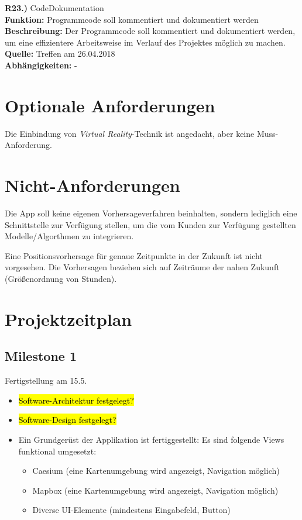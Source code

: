 \documentclass[12pt]{article} %
\begin{document}
\textbf{R23.)} CodeDokumentation \\
\textbf{Funktion:} Programmcode soll kommentiert und dokumentiert werden \\
\textbf{Beschreibung:} Der Programmcode soll kommentiert und dokumentiert werden, um eine effizientere Arbeitsweise im Verlauf des Projektes möglich zu machen. \\
\textbf{Quelle:} Treffen am 26.04.2018 \\
\textbf{Abhängigkeiten:} - \\

 \section{Optionale Anforderungen} \label{optionale_anforderungen}

Die Einbindung von \textit{Virtual Reality}-Technik ist angedacht, aber keine Muss-Anforderung.



 \section{Nicht-Anforderungen} \label{nicht-anforderungen}

Die App soll keine eigenen Vorhersageverfahren beinhalten, sondern lediglich eine Schnittstelle zur Verfügung stellen, um die vom Kunden zur Verfügung gestellten Modelle/Algorthmen zu integrieren.

Eine Positionsvorhersage für genaue Zeitpunkte in der Zukunft ist nicht vorgesehen. Die Vorhersagen beziehen sich auf Zeiträume der nahen Zukunft (Größenordnung von Stunden).



\newpage
\section{Projektzeitplan} \label{zeitplan}

\subsection*{Milestone 1}
Fertigstellung am 15.5.
\begin{itemize} 
	\item \hl{Software-Architektur festgelegt?}
	\item \hl{Software-Design festgelegt?}	
	\item Ein Grundgerüst der Applikation ist fertiggestellt: Es sind folgende Views funktional umgesetzt:
	\begin{itemize} 
		\item Caesium (eine Kartenumgebung wird angezeigt, Navigation möglich)
		\item Mapbox (eine Kartenumgebung wird angezeigt, Navigation möglich)
		\item Diverse UI-Elemente (mindestens Eingabefeld, Button)
	\end{itemize} 
\end{itemize} 
\end{document}

